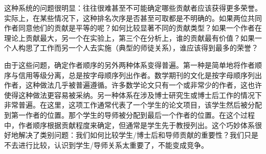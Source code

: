 这种系统的问题很明显：往往很难甚至不可能确定哪些贡献者应该获得更多荣誉。实际上，在某些情况下，这种排名次序是否甚至可取都是不明确的。如果两位共同作者同意他们的贡献是平等的呢？如何比较显著不同的贡献类型？如果一个作者在理论上贡献最大，另一个在实验上，第三个在分析上，谁的贡献最有价值？如果一个人构思了工作而另一个人去实施（典型的师徒关系），谁应该得到最多的荣誉？

由于这些问题，确定作者顺序的另外两种体系变得普遍。第一种是简单地将作者顺序与信用等级分离，总是按字母顺序列出作者。数学期刊的文化是按字母顺序列出作者，这种做法几乎被普遍遵循。许多数学论文只有一个或非常少的作者，这也许使得这种做法更容易被采纳。另一种体系在涉及博士研究生或博士后工作的情况下非常普遍。在这里，这项工作通常代表了一个学生的论文项目，该学生然后被分配到第一作者的位置。那个学生的导师被分配到最后一个作者的位置。在这个过程中，作者顺序根据贡献程度来确定，但通常是学生先于教授列出。这个巧妙体系很好地解决了类别问题：我们如何比较学生/博士后和导师贡献的重要性？我们只是不去进行比较，认识到学生/导师关系太重要了，不能变成竞争。


